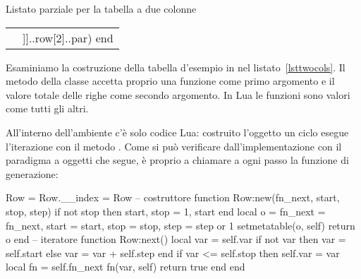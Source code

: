 \begin{tcbfloat}[sidebyside,righthand width=21mm,label=lsttwocols]{%
    Listato parziale per la tabella a due colonne}
\tcblower
\begin{tabular}{rr}
\end{tabular}
\end{tcbfloat}

Esaminiamo la costruzione della tabella d'esempio in \LuaLaTeX{} nel
listato~\ref{lsttwocols}. Il metodo  della classe  accetta
proprio una funzione come primo argomento e il valore totale delle righe come
secondo argomento. In Lua le funzioni sono valori come tutti gli altri.

All'interno dell'ambiente  c'è solo codice Lua: costruito l'oggetto
 un ciclo  esegue l'iterazione con il metodo . Come
si può verificare dall'implementazione con il paradigma a oggetti che segue, è
proprio  a chiamare a ogni passo la funzione di generazione:

%
%
\begin{lines}
Row = {}
Row.__index = Row
-- costruttore
function Row:new(fn_next, start, stop, step)
    if not stop then
        start, stop = 1, start
    end
    local o = {
        fn_next = fn_next,
        start = start,
        stop = stop,
        step = step or 1
    }
    setmetatable(o, self)
    return o
end
-- iteratore
function Row:next()
    local var = self.var
    if not var then
        var = self.start
    else
        var = var + self.step
    end
    if var <= self.stop then
        self.var = var
        local fn = self.fn_next
        fn(var, self)
        return true
    end
end
\end{lines}


